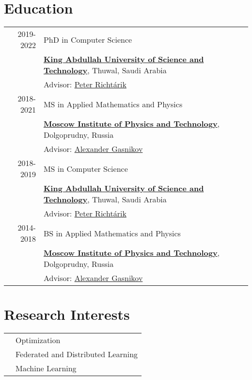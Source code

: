 
\section{Education}
\begin{tabular}{rl}	
	\textsc{2019-2022}& PhD in Computer Science\\
	& \textbf{\href{https://www.kaust.edu.sa/en}{\color{black}King Abdullah University of Science and Technology}}, Thuwal, Saudi Arabia\\
	& Advisor: \href{https://richtarik.org}{Peter Richt\'{a}rik}\\
	\textsc{2018-2021}& MS in Applied Mathematics and Physics\\
	& \textbf{\href{https://mipt.ru/}{\color{black}Moscow Institute of Physics and Technology}}, Dolgoprudny, Russia\\
	& Advisor: \href{https://scholar.google.com/citations?user=AmeE8qkAAAAJ}{Alexander Gasnikov}\\
	\textsc{2018-2019}& MS in Computer Science\\
	& \textbf{\href{https://www.kaust.edu.sa/en}{\color{black}King Abdullah University of Science and Technology}}, Thuwal, Saudi Arabia\\
	& Advisor: \href{https://richtarik.org}{Peter Richt\'{a}rik}\\
	\textsc{2014-2018}& BS in Applied Mathematics and Physics\\
	& \textbf{\href{https://mipt.ru/}{\color{black}Moscow Institute of Physics and Technology}}, Dolgoprudny, Russia\\
	& Advisor: \href{https://scholar.google.com/citations?user=AmeE8qkAAAAJ}{Alexander Gasnikov}\\
\end{tabular}

\section{Research Interests}
\begin{tabular}{cl}
	&  Optimization\\
	& Federated and Distributed Learning\\
	&  Machine Learning
\end{tabular}


